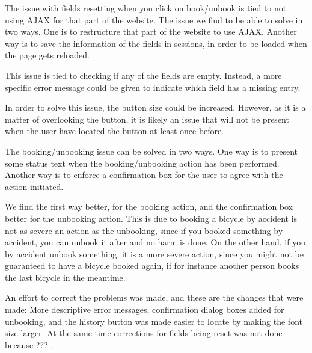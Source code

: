 \begin{description}[style=nextline]
	\item[{\#}1 Fields reset]
	The issue with fields resetting when you click on book/unbook is tied to not using AJAX for that part of the website.
	The issue we find to be able to solve in two ways.
	One is to restructure that part of the website to use AJAX.
	Another way is to save the information of the fields in sessions, in order to be loaded when the page gets reloaded. 
	\item[{\#}2 Error message understandability]
	This issue is tied to checking if any of the fields are empty.
	Instead, a more specific error message could be given to indicate which field has a missing entry.
	\item[{\#}3 Difficulty finding history]
	In order to solve this issue, the button size could be increased.
	However, as it is a matter of overlooking the button, it is likely an issue that will not be present when the user have located the button at least once before.
	\item[{\#}4 Booking/Unbooking confirmation]
	The booking/unbooking issue can be solved in two ways.
	One way is to present some status text when the booking/unbooking action has been performed.
	Another way is to enforce a confirmation box for the user to agree with the action initiated.
	
	We find the first way better, for the booking action, and the confirmation box better for the unbooking action.
	This is due to booking a bicycle by accident is not as severe an action as the unbooking, since if you booked something by accident, you can unbook it after and no harm is done.
	On the other hand, if you by accident unbook something, it is a more severe action, since you might not be guaranteed to have a bicycle booked again, if for instance another person books the last bicycle in the meantime.
\end{description}

An effort to correct the problems was made, and these are the changes that were made: More descriptive error messages, confirmation dialog boxes added for unbooking, and the history button was made easier to locate by making the font size larger.
At the same time corrections for fields being reset was not done because ??? .